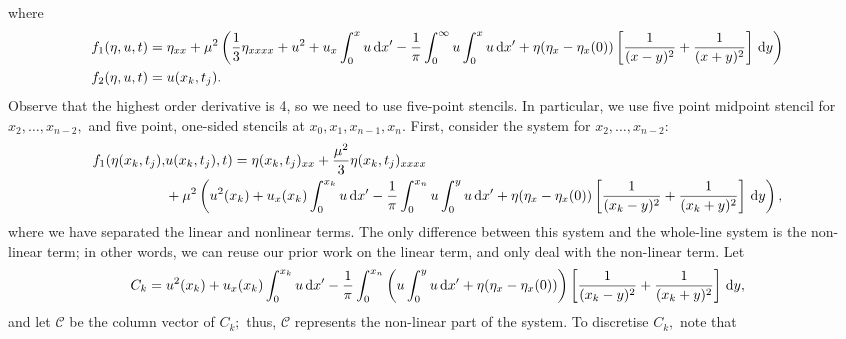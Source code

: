 \documentclass[10pt,reqno,oneside,a4paper, landscape]{article}
\begin{document}
where 
\begin{align*}
f_1(\eta, u, t) &= \eta_{xx} + \mu^2 \left(\frac{1}{3} \eta_{xxxx} + u^2 + u_{x} \int^x_{0}u \,\mathrm{d} x' - \frac{1}{\pi} \int^{\infty}_0 u\int^x_{0} u\,\mathrm{d} x' + \eta(\eta_x - \eta_x(0)) \left[ \frac{1}{(x-y)^2} + \frac{1}{(x+y)^2} \right] \,\mathrm{d} y \right) \\
f_2(\eta, u, t) &= u(x_k, t_j).
\end{align*}
Observe that the highest order derivative is 4, so we need to use five-point stencils. In particular, we use five point midpoint stencil for $x_2, \ldots, x_{n-2},$ and five point, one-sided stencils at $x_0, x_1, x_{n-1}, x_n.$ First, consider the system for $x_2, \ldots, x_{n-2}:$
\begin{align*}
f_1(\eta(x_k, t_j), &u(x_k, t_j), t) = \eta(x_k, t_j)_{xx} + \frac{\mu^2}{3} \eta(x_k, t_j)_{xxxx} \\
&+ \mu^2 \left( u^2(x_k) + u_{x}(x_k) \int^{x_k}_{0}u \,\mathrm{d} x' - \frac{1}{\pi} \int^{x_n}_0 u\int^y_{0} u\,\mathrm{d} x' + \eta(\eta_x - \eta_x(0)) \left[ \frac{1}{(x_k-y)^2} + \frac{1}{(x_k+y)^2} \right] \,\mathrm{d} y \right),
\end{align*}
where we have separated the linear and nonlinear terms. The only difference between this system and the whole-line system is the non-linear term; in other words, we can reuse our prior work on the linear term, and only deal with the non-linear term. Let 
\[ 
C_k = u^2(x_k) + u_{x}(x_k) \int^{x_k}_{0}u \,\mathrm{d} x' - \frac{1}{\pi} \int^{x_n}_0 \left(u\int^y_{0} u\,\mathrm{d} x' + \eta(\eta_x - \eta_x(0))\right) \left[ \frac{1}{(x_k-y)^2} + \frac{1}{(x_k+y)^2} \right] \,\mathrm{d} y,
\]
and let $\mathcal{C}$ be the column vector of $C_k;$ thus, $\mathcal{C}$ represents the non-linear part of the system. To discretise $C_k,$ note that
\end{document}
